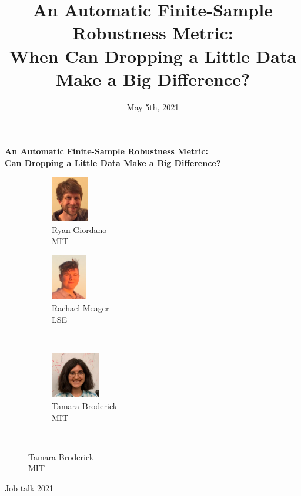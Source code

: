 \documentclass[10pt]{beamer}
\title{An Automatic Finite-Sample Robustness Metric:
\\When Can Dropping a Little Data Make a Big Difference?}
\author{}
\date{May 5th, 2021}
\begin{document}

\begin{frame}

\begin{center}
\large
\textbf{
An Automatic Finite-Sample Robustness Metric:
\\Can Dropping a Little Data Make a Big Difference?}
\end{center}

\hrulefill

\begin{figure}
    \begin{subfigure}{0.32\textwidth}
        \centering
        \includegraphics[height=2cm]{collaborators/ryan}
        \caption*{Ryan Giordano \\ MIT}
    \end{subfigure}
    \begin{subfigure}{.32\textwidth}
        \centering
        \includegraphics[height=2cm]{collaborators/rachael}
    \captionsetup{justification=centering}
        \caption*{Rachael Meager \\ LSE}
    \end{subfigure}
    \vspace{0.11in}
\  		\begin{subfigure}{.32\textwidth}
        \centering
        \includegraphics[height=2cm]{collaborators/tamara}
        \caption*{Tamara Broderick \\ MIT}
    \end{subfigure}\\
\end{figure}
\hrulefill

Job talk 2021

\end{frame}
\end{document}
